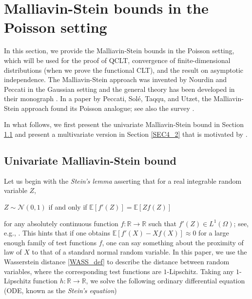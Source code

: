 \documentclass[letterpaper, 11pt,  reqno]{amsart}
\newcommand{\R}{\mathbb{R}}
\newcommand{\bE}{\mathbb{E}}
\newcommand{\cN}{\mathcal{N}}
\renewcommand{\O}{\Omega}
\numberwithin{equation}{section}
\numberwithin{theorem}{section}
\begin{document}
 
 
\section{Malliavin-Stein bounds in the Poisson setting}
\label{section-MS}


In this section, we provide the Malliavin-Stein bounds
 in the Poisson setting,
 which will be used for the proof of  \textsf{QCLT}, convergence of finite-dimensional
  distributions (when we prove the functional CLT), 
  and  the result  on asymptotic independence.
 The Malliavin-Stein approach was invented by Nourdin and Peccati 
 in  the Gaussian setting \cite{NP_ptrf} and 
 the general theory has been developed in their monograph \cite{blue}.
 In a paper  \cite{PSTU10} by  Peccati, Sol\'e, Taqqu, and Utzet,
 the Malliavin-Stein approach found its Poisson analogue;
 see also the survey \cite{BP16}.
  
  
  In what follows, we first present the univariate Malliavin-Stein bound
  in Section \ref{SEC4_1}
  and  present a multivariate version in 
  Section \ref{SEC4_2}
  that is motivated by \cite{pimentel, tudor23}.
  
  
   
  
  

\subsection{Univariate Malliavin-Stein bound}\label{SEC4_1}


Let us begin with the {\it Stein's lemma} 
asserting that for a real  integrable random variable $Z$,
\begin{center}
$Z\sim\cN(0,1)$ if and only if $\bE[ f'(Z)]  = \bE[ Z f(Z)]$
\end{center}
for any absolutely continuous   function 
$f: \R\to\R$ such that $f'(Z)\in L^1(\O)$;
see, e.g., \cite[Lemma 2.1]{Ross11}.
This hints that
if one obtains $\bE[ f'(X) - Xf(X)]\approx 0$ for a large enough family 
of test functions $f$, one can say something about the proximity 
of law of $X$ to that of a standard normal random variable. 
In this paper, we use the Wasserstein distance \eqref{WASS_def}
to describe the distance between random variables,
where the corresponding test functions are $1$-Lipschitz.  
Taking any  $1$-Lipschitz function  $h:\R\to\R$, 
 we solve the following ordinary differential equation (ODE,  known as 
 the {\it Stein's equation})
\end{document}
